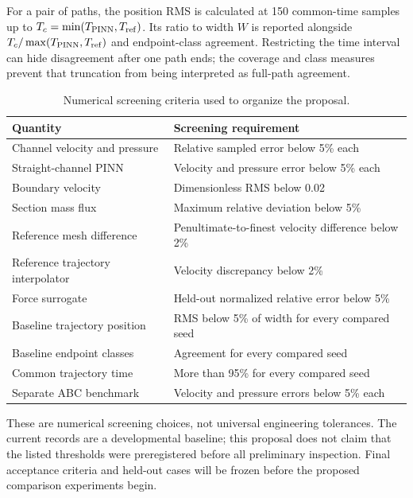 For a pair of paths, the position RMS is calculated at 150 common-time
samples up to $T_c=\min(T_{\rm PINN},T_{\rm ref})$. Its ratio to width $W$
is reported alongside $T_c/\max(T_{\rm PINN},T_{\rm ref})$ and endpoint-class
agreement. Restricting the time interval can hide disagreement after one
path ends; the coverage and class measures prevent that truncation from
being interpreted as full-path agreement.

\begin{table}[!htbp]
\centering\small
\caption{Numerical screening criteria used to organize the proposal.}
\label{tab:criteria}
\begin{tabularx}{\textwidth}{@{}p{}Y@{}}
\toprule Quantity & Screening requirement\\\midrule
Channel velocity and pressure & Relative sampled error below 5\% each\\
Straight-channel PINN & Velocity and pressure error below 5\% each\\
Boundary velocity & Dimensionless RMS below 0.02\\
Section mass flux & Maximum relative deviation below 5\%\\
Reference mesh difference & Penultimate-to-finest velocity difference below 2\%\\
Reference trajectory interpolator & Velocity discrepancy below 2\%\\
Force surrogate & Held-out normalized relative error below 5\%\\
Baseline trajectory position & RMS below 5\% of width for every compared seed\\
Baseline endpoint classes & Agreement for every compared seed\\
Common trajectory time & More than 95\% for every compared seed\\
Separate ABC benchmark & Velocity and pressure errors below 5\% each\\
\bottomrule
\end{tabularx}
\end{table}
These are numerical screening choices, not universal engineering tolerances.
The current records are a developmental baseline; this proposal does not
claim that the listed thresholds were preregistered before all preliminary
inspection. Final acceptance criteria and held-out cases will be frozen
before the proposed comparison experiments begin.

